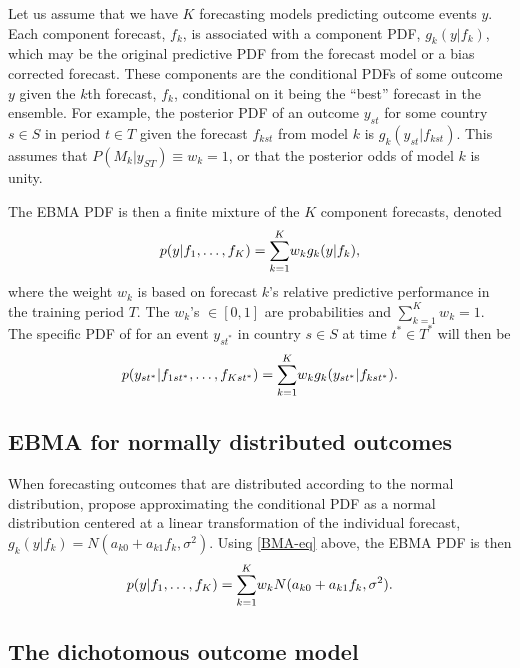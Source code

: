 \documentclass[pdftex,12pt,fullpage,oneside]{amsart}
\begin{document}
Let us assume that we have $K$ forecasting models predicting outcome
events $y$. Each component forecast, $f_k$, is associated with a
component PDF, $g_k(y|f_k)$, which may be the original predictive PDF
from the forecast model or a bias corrected forecast.  These
components are the conditional PDFs of some outcome $y$ given the
$k$th forecast, $f_k$, conditional on it being the ``best'' forecast
in the ensemble. For example, the posterior PDF of an outcome $y_{st}$
for some country $s \in S$ in period $t \in T$ given the forecast
$f_{kst}$ from model $k$ is $g_k(y_{st}|f_{kst})$. This assumes that
$P(M_k | y_{ST}) \equiv w_k=1$, or that the posterior odds of model
$k$ is unity.

The EBMA PDF is then a finite mixture of the $K$ component forecasts,
denoted
\begin{equation}
\small
\label{BMA-eq}
p(y|f_1, \ldots, f_K)=\overset{K}{\underset{k=1}{\sum}} w_k
g_k(y|f_k),
\end{equation}
 \noindent where the weight $w_k$ is based on forecast $k$'s relative
predictive performance in the training period $T$. The $w_k$'s $\in
[0,1]$ are probabilities and $\sum_{k=1}^Kw_k=1$.  The specific PDF of
for an event $y_{st^*}$ in country $s\in S$ at time $t^* \in T^*$ will
then be
\begin{equation}
\label{BMA-eq2}
\small
p(y_{st^*}|f_{1st^*}, \ldots,
f_{Kst^*})=\overset{K}{\underset{k=1}{\sum}} w_k
g_k(y_{st^*}|f_{kst^*}).
\end{equation}

\subsection{EBMA for normally distributed outcomes}

When forecasting outcomes that are distributed according to the normal
distribution, \citet{Raftery:2005} propose approximating the
conditional PDF as a normal distribution centered at a linear
transformation of the individual forecast, $g_k(y|f_k) = N(a_{k0} + a_{k1}f_k,
\sigma^2)$.  Using \eqref{BMA-eq} above, the EBMA PDF is then
\begin{equation} \small
p(y|f_1, \ldots, f_K) = \overset{K}{\underset{k=1}{\sum}} w_k N(a_{k0} +
a_{k1}f_k, \sigma^2).
\end{equation}

\subsection{The dichotomous outcome model}
\end{document}
